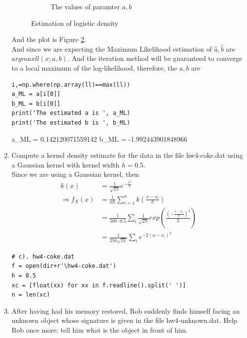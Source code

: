 \documentclass[preprint,12pt]{elsarticle}
\begin{document}
\begin{enumerate}[label=\alph*]
\begin{figure}[htbp!]
\begin{subfigure}{0.8\textwidth}
                \caption{The values of paramter $a,b$}
                \label{fig:12}
            \end{subfigure}
            \caption{Estimation of logistic density}
            \label{fig:1}
        \end{figure}
        And the plot is Figure \ref{fig:1}.\\

        And since we are expecting the Maximum Likelihood estimation of 
        $\hat{a},\hat{b}$ are $arg max ll(x;a,b)$. And the iteration method
        will be guaranteed to converge to a local maximum of the log-likelihood,
        therefore, the $a,b$ are
        \begin{lstlisting}
i,=np.where(np.array(ll)==max(ll))
a_ML = a[i[0]]
b_ML = b[i[0]]
print('The estimated a is ', a_ML)
print('The estimated b is ', b_ML)
        \end{lstlisting}

        \begin{spverbatim}
a_ML = 0.142120071559142
b_ML = -1.992443901848966 
        \end{spverbatim}

        \item Compute a kernel density estimate for the data in the file
        hw4-coke.dat using a Gaussian kernel with kernel width $h=0.5$.\\

        Since we are using a Gaussian kernel, then
        \begin{align*}
            k(x) &= \frac{1}{\sqrt{2\pi}}e^{-\frac{x^2}{2}}\\
            \Rightarrow f_X(x) &= \frac{1}{nh}\sum_{i=1}^n k(\frac{x-x_i}{h}) \\
            &= \frac{1}{500\cdot 0.5}\sum_{i} \frac{1}{\sqrt{2\pi}} exp(\frac{(-\frac{x-x_i}{h})^2}{2})\\
            &= \frac{1}{250\sqrt{2\pi}}\sum_{i} e^{-2(x-x_i)^2}
        \end{align*}

        \begin{lstlisting}
# c). hw4-coke.dat
f = open(dir+r'\hw4-coke.dat')
h = 0.5
xc = [float(xx) for xx in f.readline().split(' ')]
n = len(xc)
        \end{lstlisting}

        \item After having had his memory restored, Rob suddenly finds himself
        facing an unknown object whose signature is given in the file hw4-unknown.dat.
        Help Rob once more: tell him what is the object in front of him.\\


\end{enumerate}
\end{document}
